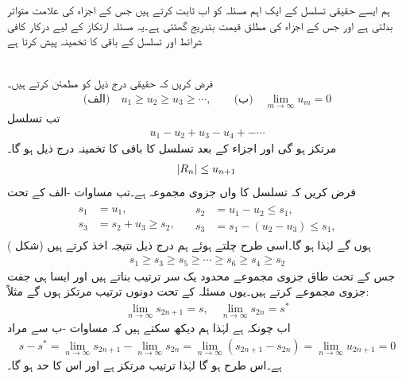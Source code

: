 ہم ایسے حقیقی تسلسل کے ایک اہم مسئلہ کو اب ثابت کرتے ہیں جس کے اجزاء کی علامت متواتر بدلتی ہے اور جس کے اجزاء کی مطلق قیمت بتدریج گھٹتی ہے۔یہ مسئلہ ارتکاز کے لیے درکار کافی شرائط  اور تسلسل کے باقی کا تخمینہ پیش کرتا ہے

\quad {}\\
فرض کریں کہ حقیقی  درج ذیل کو مطمئن کرتے ہیں۔
\begin{align}\label{مسئلہ_ترتیب_آزمائش_لیبنٹز_الف}
\text{(الف)}\quad u_1\ge u_2\ge u_3\ge \cdots,\quad \quad \text{(ب)}\quad \lim_{m\to\infty} u_m=0
\end{align}
تب تسلسل
\begin{align*}
u_1-u_2+u_3-u_4+-\cdots
\end{align*}
مرتکز ہو گی اور  اجزاء کے بعد تسلسل کا باقی کا تخمینہ درج ذیل ہو گا۔
\begin{align}\label{مسئلہ_ترتیب_آزمائش_لیبنٹز_ب}
\abs{R_n}\le u_{n+1}
\end{align}
\quad
فرض کریں کہ  تسلسل کا  واں جزوی مجموعہ ہے۔تب  مساوات -الف کے تحت 
\begin{gather*}
\begin{aligned}
s_1&=u_1,\\
s_3&=s_2+u_3\ge s_2,
\end{aligned}\quad
\begin{aligned}
 s_2&=u_1-u_2\le s_1,\\
 s_3&=s_1-(u_2-u_3)\le s_1,
\end{aligned}
\end{gather*}
ہوں گے لہٰذا  ہو گا۔اسی طرح چلتے ہوئے ہم درج ذیل نتیجہ اخذ کرتے ہیں (شکل )
\begin{align}\label{مسئلہ_ترتیب_آزمائش_لیبنٹز_پ}
s_1\ge s_3\ge s_5\ge \cdots\ge s_6\ge s_4\ge s_2
\end{align}
جس کے تحت طاق جزوی مجموعے محدود یک سر ترتیب بناتے ہیں اور ایسا ہی جفت جزوی مجموعے کرتے ہیں۔یوں مسئلہ  کے تحت دونوں ترتیب مرتکز ہوں گے مثلاً:
\begin{align*}
\lim_{n\to\infty} s_{2n+1}=s,\quad \lim_{n\to\infty} s_{2n}=s^*
\end{align*} 
اب چونکہ  ہے لہٰذا ہم دیکھ سکتے ہیں کہ مساوات -ب سے مراد 
\begin{align*}
s-s^*=\lim_{n\to\infty}s_{2n+1}-\lim_{n\to\infty}s_{2n}=\lim_{n\to\infty}(s_{2n+1}-s_{2n})=\lim_{n\to\infty} u_{2n+1}=0
\end{align*}
ہے۔اس طرح   ہو گا لہٰذا  ترتیب مرتکز ہے اور اس کا حد  ہو گا۔

